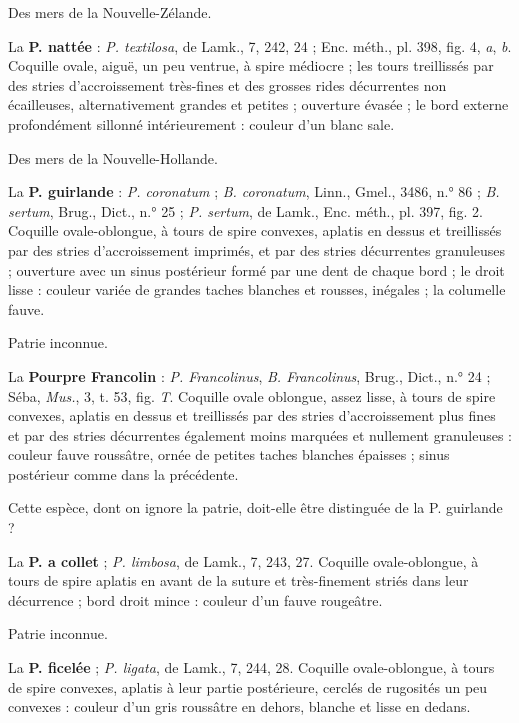 \documentclass[a4paper, 11pt, oneside, polutonikogreek, french]{article}
\begin{document}
Des mers de la Nouvelle-Zélande.

\bigskip

La \textbf{P. nattée} : \emph{P. textilosa}, de Lamk., 7, 242, 24 ; Enc. méth., pl. 398, fig. 4, \emph{a}, \emph{b}. Coquille ovale, aiguë, un peu ventrue, à spire médiocre ; les tours treillissés par des stries d'accroissement très-fines et des grosses rides décurrentes non écailleuses, alternativement grandes et petites ; ouverture évasée ; le bord externe profondément sillonné intérieurement : couleur d'un blanc sale.

Des mers de la Nouvelle-Hollande.

\bigskip

La \textbf{P. guirlande} : \emph{P. coronatum} ; \emph{B. coronatum}, Linn., Gmel., 3486, n.° 86 ; \emph{B. sertum}, Brug., Dict., n.° 25 ; \emph{P. sertum}, de Lamk., Enc. méth., pl. 397, fig. 2. Coquille ovale-oblongue, à tours de spire convexes, aplatis en dessus et treillissés par des stries d'accroissement imprimés, et par des stries décurrentes granuleuses ; ouverture avec un sinus postérieur formé par une dent de chaque bord ; le droit lisse : couleur variée de grandes taches blanches et rousses, inégales ; la columelle fauve.

Patrie inconnue.

\bigskip

La \textbf{Pourpre Francolin} : \emph{P. Francolinus}, \emph{B. Francolinus}, Brug., Dict., n.° 24 ; Séba, \emph{Mus.}, 3, t. 53, fig. \emph{T}. Coquille ovale oblongue, assez lisse, à tours de spire convexes, aplatis en dessus et treillissés par des stries d'accroissement plus fines et par des stries décurrentes également moins marquées et nullement granuleuses : couleur fauve roussâtre, ornée de petites taches blanches épaisses ; sinus postérieur comme dans la précédente.

Cette espèce, dont on ignore la patrie, doit-elle être distinguée de la P. guirlande ?

\bigskip

La \textbf{P. a collet} ; \emph{P. limbosa}, de Lamk., 7, 243, 27. Coquille ovale-oblongue, à tours de spire aplatis en avant de la suture et très-finement striés dans leur décurrence ; bord droit mince : couleur d'un fauve rougeâtre.

Patrie inconnue.

\bigskip

La \textbf{P. ficelée} ; \emph{P. ligata}, de Lamk., 7, 244, 28. Coquille ovale-oblongue, à tours de spire convexes, aplatis à leur partie postérieure, cerclés de rugosités un peu convexes : couleur d'un gris roussâtre en dehors, blanche et lisse en dedans.
\end{document}
